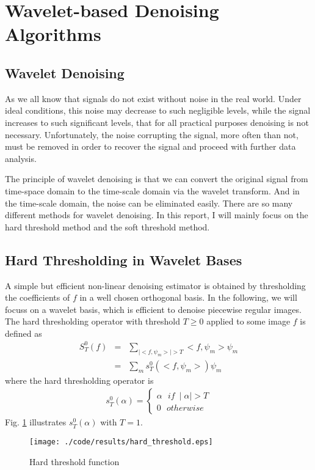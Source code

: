 \documentclass[journal,comsoc]{IEEEtran}
\begin{document}

\section{Wavelet-based Denoising Algorithms}
\label{sec:wavelet-based-algorithms}

\subsection{Wavelet Denoising}
\label{sec:wavelet-denoising}

As we all know that signals do not exist without noise in the real world.
Under ideal conditions, this noise may decrease to such negligible
levels, while the signal increases to such significant levels, that for all practical purposes denoising
is not necessary. Unfortunately, the noise corrupting the signal, more often than not, must be
removed in order to recover the signal and proceed with further data analysis.

The principle of wavelet denoising\cite{wavelet} is that we can convert the original signal from time-space domain to
the time-scale domain via the wavelet transform. And in the time-scale domain, the noise can be eliminated
easily. There are so many different methods for wavelet denoising. In this report, I will mainly focus on
the hard threshold method and the soft threshold method.

\subsection{Hard Thresholding in Wavelet Bases}
\label{subsec:hard-thresholding-in-wavelet-bases}

A simple but efficient non-linear denoising estimator is obtained by thresholding the coefficients of $f$
in a well chosen orthogonal basis.
In the following, we will focuss on a wavelet basis, which is efficient to denoise piecewise regular images.
The hard thresholding operator with threshold $T\ge{0}$ applied to some image $f$ is defined as
\begin{eqnarray}
  S_T^0(f)&=&\sum_{\mid{<f,\psi_m>\mid}>T}<f,\psi_m>\psi_m\\
  &=&\sum_{m}s_T^0{(<f,\psi_m>)\psi_m}\nonumber
\end{eqnarray}
where the hard thresholding operator is
\begin{eqnarray}
  s_T^{0}(\alpha)=
  \begin{cases}
    \alpha\ \ \ if\ \mid{\alpha}\mid>T\\
    0\ \ \ otherwise
  \end{cases}
\end{eqnarray}
Fig. \ref{fig:hard-threshold-function} illustrates $s_T^0{(\alpha)}$ with $T=1$.
\begin{figure}[!htb]
  \centering
  \texttt{[image: ./code/results/hard\_threshold.eps]}
  \caption{Hard threshold function}
  \label{fig:hard-threshold-function}    
\end{figure}
\end{document}

